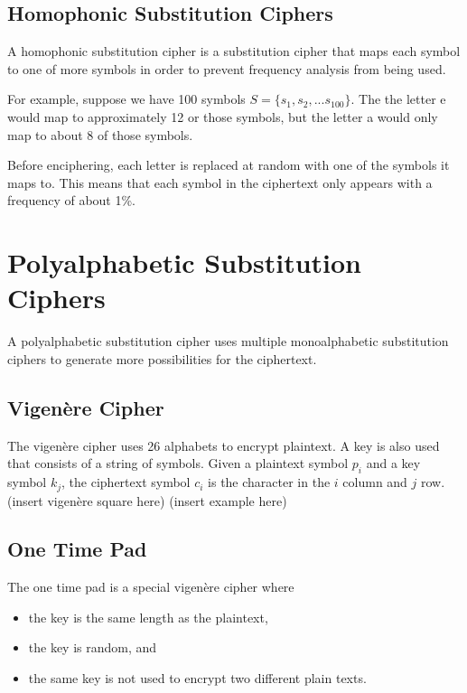 \documentclass[12pt]{article}
\begin{document}
\subsection{Homophonic Substitution Ciphers}
A homophonic substitution cipher is a substitution cipher that maps each symbol to one of more symbols in order to prevent frequency analysis from being used. 

For example, suppose we have 100 symbols $S=\{s_1,s_2,...s_100\}$. The the letter e would map to approximately 12 or those symbols, but the letter a would only map to about 8 of those symbols.

Before enciphering, each letter is replaced at random with one of the symbols it maps to. This means that each symbol in the ciphertext only appears with a frequency of about 1\%.

\section{Polyalphabetic Substitution Ciphers}
A polyalphabetic substitution cipher uses multiple monoalphabetic substitution ciphers to generate more possibilities for the ciphertext.

\subsection{Vigen\`{e}re Cipher}
The vigen\`{e}re cipher uses 26 alphabets to encrypt plaintext. A key is also used that consists of a string of symbols. Given a plaintext symbol $p_i$ and a key symbol $k_j$, the ciphertext symbol $c_i$ is the character in the $i$ column and $j$ row.
(insert vigen\`{e}re square here)
(insert example here)
\subsection{One Time Pad}
The one time pad is a special vigen\`{e}re cipher where
\begin{itemize}
	\item the key is the same length as the plaintext,
	\item the key is random, and
	\item the same key is not used to encrypt two different plain texts.
\end{itemize}

\newpage


\end{document}
